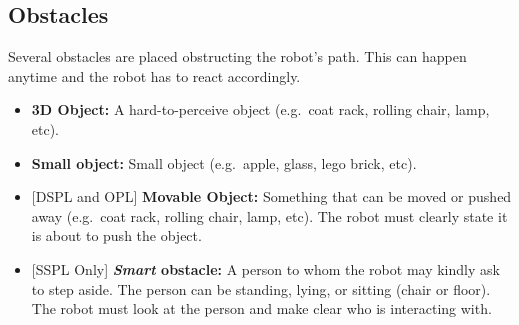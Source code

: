 \subsection{Obstacles}
\label{sec:helpmecarry_obstacles}
Several obstacles are placed obstructing the robot's path. This can happen anytime and the robot has to react accordingly.
\begin{itemize}
  \item \textbf{3D Object:} A hard-to-perceive object
  (e.g.~coat rack, rolling chair, lamp, etc).

  \item \textbf{Small object:} Small object
  (e.g.~apple, glass, lego brick, etc).

  \item {[DSPL and OPL]} \textbf{Movable Object:} Something that can be moved or pushed away
  (e.g.~coat rack, rolling chair, lamp, etc).
  The robot must clearly state it is about to push the object.

  \item {[SSPL Only]} \textbf{\textit{Smart} obstacle:} A person to whom the robot may kindly ask to step aside.
  The person can be standing, lying, or sitting (chair or floor).
  The robot must look at the person and make clear who is interacting with.
\end{itemize}


